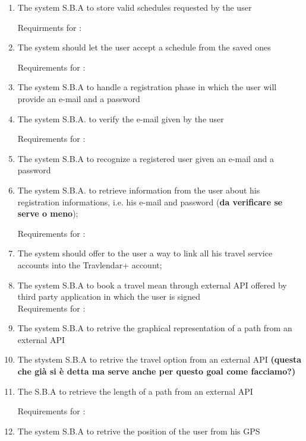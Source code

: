 \begin{enumerate}
\item The system S.B.A to store valid schedules requested by the user


Requirments for :

\item The system should let the user accept a schedule from the saved ones 

Requirements for :

\item The system S.B.A to handle a registration phase in which the user will provide an e-mail and a password

\item The system S.B.A. to verify the e-mail given by the user


Requirements for :
\item The system S.B.A to recognize a registered user given an e-mail and a password \label{req:R9}

\item The system S.B.A. to retrieve information from the user about his registration informations, i.e. his e-mail and password (\textbf{da verificare se serve o meno}); \label{req:R10}

Requirements for : 

\item The system should offer to the user a way to link all his travel service accounts into the Travlendar+ account;

\item The system S.B.A to book a travel mean through external API offered by third party application in which the user is signed
\\

Requirements for :

\item The system S.B.A to retrive the graphical representation of a path from an external API 

\item The stystem S.B.A to retrive the travel option from an external API \textbf{(questa che già si è detta ma serve anche per questo goal come facciamo?)}

\item The S.B.A to retrieve the length of a path from an external API  


Requirements for :

\item The system S.B.A to retrive the position of the user from his GPS


\end{enumerate}
